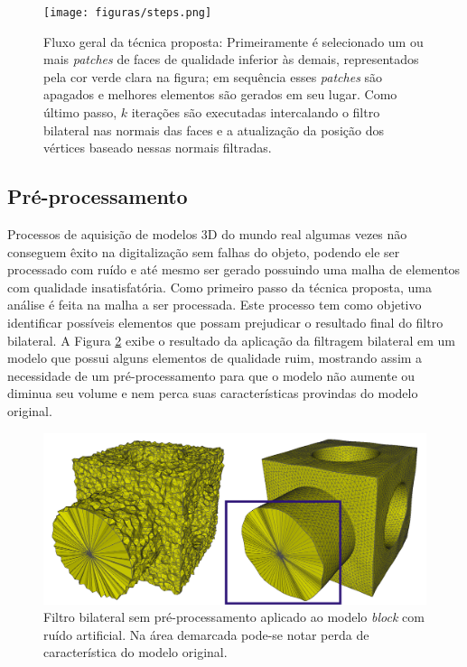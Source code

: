 \begin{figure}[!t]
\captionsetup{width=\linewidth}
\centering
\texttt{[image: figuras/steps.png]}
\caption{Fluxo geral da técnica proposta: Primeiramente é selecionado um ou mais \textit{patches} de faces de qualidade inferior às demais, representados pela cor verde clara na figura; em sequência esses \textit{patches} são apagados e melhores elementos são gerados em seu lugar. Como último passo, $k$ iterações são executadas intercalando o filtro bilateral nas normais das faces e a atualização da posição dos vértices baseado nessas normais filtradas.}
\label{fig:steps}
\end{figure}

\subsection{Pré-processamento}

Processos de aquisição de modelos 3D do mundo real algumas vezes não conseguem êxito na digitalização sem falhas do objeto, podendo ele ser processado com ruído e até mesmo ser gerado possuindo uma malha de elementos com qualidade insatisfatória. Como primeiro passo da técnica proposta, uma análise é feita na malha a ser processada. Este processo tem como objetivo identificar possíveis elementos que possam prejudicar o resultado final do filtro bilateral. A Figura \ref{fig:comparisonwithoutpreprocessing} exibe o resultado da aplicação da filtragem bilateral em um modelo que possui alguns elementos de qualidade ruim, mostrando assim a necessidade de um pré-processamento para que o modelo não aumente ou diminua seu volume e nem perca suas características provindas do modelo original.


\begin{figure}[!h]
\captionsetup{width=\linewidth}
\centering
\includegraphics[width=\linewidth]{figuras/comparison.png}
\caption{Filtro bilateral sem pré-processamento aplicado ao modelo \textit{block} com ruído artificial. Na área demarcada pode-se notar perda de característica do modelo original.}
\label{fig:comparisonwithoutpreprocessing}
\end{figure}


